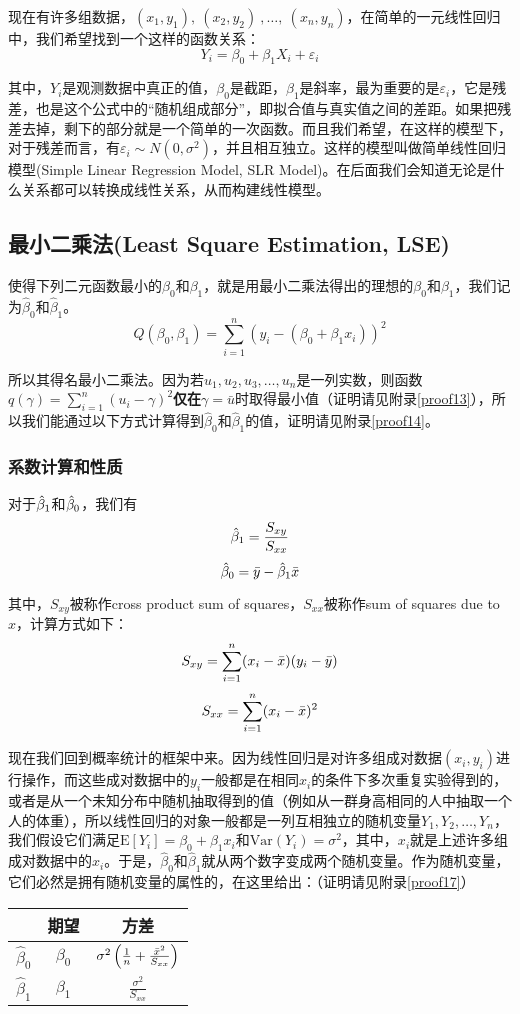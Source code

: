 \documentclass[UTF8]{ctexart}
\begin{document}
现在有许多组数据，$(x_1,y_1),\ (x_2,y_2)\ ,\dots,\ (x_n,y_n)$，在简单的一元线性回归中，我们希望找到一个这样的函数关系：
\[
Y_i=\beta_0+\beta_1X_i+\varepsilon_i
\]

其中，$Y_i$是观测数据中真正的值，$\beta_0$是截距，$\beta_1$是斜率，最为重要的是$\varepsilon_i$，它是残差，也是这个公式中的“随机组成部分”，即拟合值与真实值之间的差距。如果把残差去掉，剩下的部分就是一个简单的一次函数。而且我们希望，在这样的模型下，对于残差而言，有$\varepsilon_i\sim N(0,\sigma^2)$，并且相互独立。这样的模型叫做简单线性回归模型(Simple Linear Regression Model, SLR Model)。在后面我们会知道无论是什么关系都可以转换成线性关系，从而构建线性模型。
\subsection{最小二乘法(Least Square Estimation, LSE)}
\label{LSE definition}
使得下列二元函数最小的$\beta_0$和$\beta_1$，就是用最小二乘法得出的理想的$\beta_0$和$\beta_1$，我们记为$\hat\beta_0$和$\hat\beta_1$。
\[
Q(\beta_0,\beta_1)=\sum_{i=1}^n(y_i-(\beta_0+\beta_1x_i))^2
\]

所以其得名最小二乘法。因为若$u_1,u_2,u_3,\dots,u_n$是一列实数，则函数$q(\gamma)=\sum_{i=1}^n(u_i-\gamma)^2$\textbf{仅在}$\gamma=\bar u$时取得最小值（证明请见附录\ref{proof13}），所以我们能通过以下方式计算得到$\hat\beta_0$和$\hat\beta_1$的值，证明请见附录\ref{proof14}。
\subsubsection{系数计算和性质}
对于$\Hat{\beta}_1$和$\Hat{\beta}_0$，我们有
\[
	\Hat{\beta}_1=\frac{S_{xy}}{S_{xx}}
\]
\[
	\Hat{\beta}_0=\Bar{y}-\hat\beta_1\Bar{x}
\]

其中，$S_{xy}$被称作cross product sum of squares，$S_{xx}$被称作sum of squares due to $x$，计算方式如下：
\[
	S_{xy}=\sum_{i=1}^n(x_i-\Bar{x})(y_i-\Bar{y})
\]
\[
	S_{xx}=\sum_{i=1}^n(x_i-\Bar{x})^2
\]

现在我们回到概率统计的框架中来。因为线性回归是对许多组成对数据$(x_i,y_i)$进行操作，而这些成对数据中的$y_i$一般都是在相同$x_i$的条件下多次重复实验得到的，或者是从一个未知分布中随机抽取得到的值（例如从一群身高相同的人中抽取一个人的体重），所以线性回归的对象一般都是一列互相独立的随机变量$Y_1,Y_2,\dots,Y_n$，我们假设它们满足$\mathrm E[Y_i]=\beta_0+\beta_1x_i$和$\mathrm{Var}(Y_i)=\sigma^2$，其中，$x_i$就是上述许多组成对数据中的$x_i$。于是，$\hat\beta_0$和$\hat\beta_1$就从两个数字变成两个随机变量。作为随机变量，它们必然是拥有随机变量的属性的，在这里给出：（证明请见附录\ref{proof17}）
\begin{center}
    \begin{tabular}{|c|c|c|}
    \hline\hline
         &期望&方差  \\\hline
         $\hat\beta_0$& $\beta_0$ & $\sigma^2\left(\frac{1}{n}+\frac{\Bar{x}^2}{S_{xx}}\right)$\\\hline
         $\hat\beta_1$& $\beta_1$ & $\frac{\sigma^2}{S_{xx}}$\\ \hline\hline
    \end{tabular}
\end{center}
\end{document}
